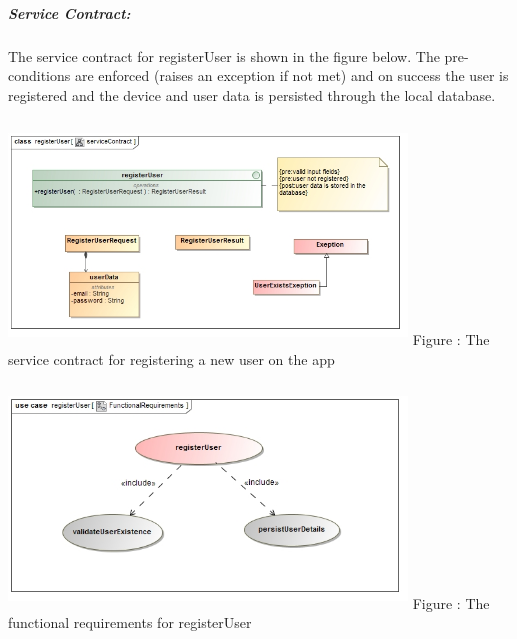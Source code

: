 \documentclass[hidelinks, 12pt, oneside]{article}
\begin{document}
	\subparagraph{Service Contract:}
		The service contract for registerUser is shown in the figure below. The pre-conditions are enforced (raises an exception if not met) and on
		success the user is registered and the device and user data is persisted through the local database.\\\\
	\includegraphics[width=400px,height=220px]{img/serviceContractRegisterUser.jpg}
		Figure : The service contract for registering a new user on the app\\\\
	\includegraphics[width=400px,height=220px]{img/functionalRequirementsRegister.jpg}
		Figure : The functional requirements for registerUser
		\newpage
\end{document}
